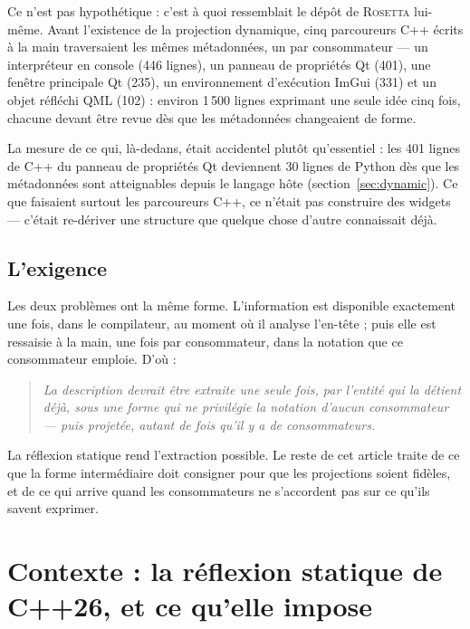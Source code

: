 \documentclass[11pt,a4paper]{article}
\newcommand{\rosetta}{\textsc{Rosetta}}
\begin{document}
Ce n'est pas hypothétique : c'est à quoi ressemblait le dépôt de \rosetta{}
lui-même. Avant l'existence de la projection dynamique, cinq parcoureurs C++
écrits à la main traversaient les mêmes métadonnées, un par consommateur --- un
interpréteur en console (446 lignes), un panneau de propriétés Qt (401), une
fenêtre principale Qt (235), un environnement d'exécution ImGui (331) et un
objet réfléchi QML (102) : environ 1\,500 lignes exprimant une seule idée cinq
fois, chacune devant être revue dès que les métadonnées changeaient de forme.

La mesure de ce qui, là-dedans, était accidentel plutôt qu'essentiel : les 401
lignes de C++ du panneau de propriétés Qt deviennent 30 lignes de Python dès que
les métadonnées sont atteignables depuis le langage hôte
(section~\ref{sec:dynamic}). Ce que faisaient surtout les parcoureurs C++,
ce n'était pas construire des widgets --- c'était re-dériver une structure que
quelque chose d'autre connaissait déjà.

\subsection{L'exigence}

Les deux problèmes ont la même forme. L'information est disponible exactement une
fois, dans le compilateur, au moment où il analyse l'en-tête ; puis elle est
ressaisie à la main, une fois par consommateur, dans la notation que ce
consommateur emploie. D'où :

\begin{quote}\itshape
La description devrait être extraite une seule fois, par l'entité qui la détient
déjà, sous une forme qui ne privilégie la notation d'aucun consommateur --- puis
projetée, autant de fois qu'il y a de consommateurs.
\end{quote}

La réflexion statique rend l'extraction possible. Le reste de cet article traite
de ce que la forme intermédiaire doit consigner pour que les projections soient
fidèles, et de ce qui arrive quand les consommateurs ne s'accordent pas sur ce
qu'ils savent exprimer.

\section{Contexte : la réflexion statique de C++26, et ce qu'elle impose}
\label{sec:background}
\end{document}
